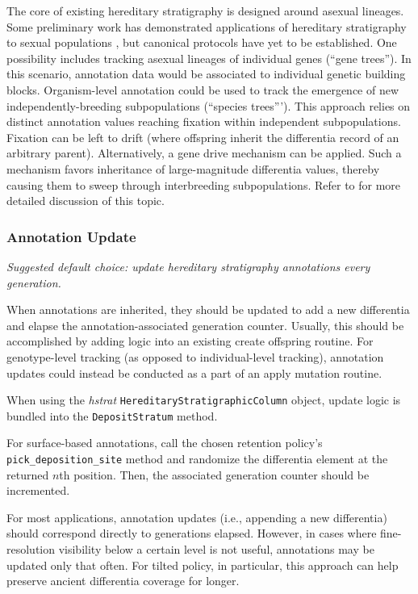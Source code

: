 The core of existing hereditary stratigraphy is designed around asexual lineages.
Some preliminary work has demonstrated applications of hereditary stratigraphy to sexual populations \citep{moreno2024methods}, but canonical protocols have yet to be established.
One possibility includes tracking asexual lineages of individual genes (``gene trees'').
In this scenario, annotation data would be associated to individual genetic building blocks.
Organism-level annotation could be used to track the emergence of new independently-breeding subpopulations (``species trees''').
This approach relies on distinct annotation values reaching fixation within independent subpopulations.
Fixation can be left to drift (where offspring inherit the differentia record of an arbitrary parent).
Alternatively, a gene drive mechanism can be applied.
Such a mechanism favors inheritance of large-magnitude differentia values, thereby causing them to sweep through interbreeding subpopulations.
Refer to \citet{moreno2024methods} for more detailed discussion of this topic.

\subsubsection{Annotation Update}
\textit{Suggested default choice: update hereditary stratigraphy annotations every generation.}

When annotations are inherited, they should be updated to add a new differentia and elapse the annotation-associated generation counter.
Usually, this should be accomplished by adding logic into an existing create offspring routine.
For genotype-level tracking (as opposed to individual-level tracking), annotation updates could instead be conducted as a part of an apply mutation routine.

When using the \textit{hstrat} \texttt{HereditaryStratigraphicColumn} object, update logic is bundled into the \texttt{DepositStratum} method.

For surface-based annotations, call the chosen retention policy's \texttt{pick\_deposition\_site} method and randomize the differentia element at the returned $n$th position.
Then, the associated generation counter should be incremented.

For most applications, annotation updates (i.e., appending a new differentia) should correspond directly to generations elapsed.
However, in cases where fine-resolution visibility below a certain level is not useful, annotations may be updated only that often.
For tilted policy, in particular, this approach can help preserve ancient differentia coverage for longer.

